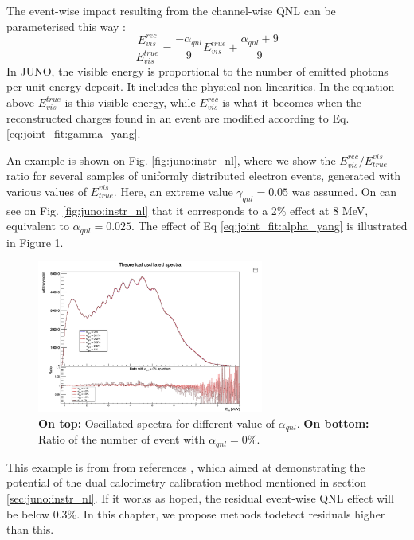\documentclass[../main.tex]{subfiles}
\begin{document}
The event-wise impact resulting from the channel-wise QNL can be parameterised this way :
\begin{equation}
  \label{eq:joint_fit:alpha_yang}
  \frac{E^{rec}_{vis}}{E^{true}_{vis}} = \frac{-\alpha_{qnl}}{9} E^{true}_{vis} + \frac{\alpha_{qnl} + 9}{9}
\end{equation}
In JUNO, the visible energy is proportional to the number of emitted photons per unit energy deposit. It includes the physical non linearities.
In the equation above $E_{vis}^{true}$ is this visible energy, while $E_{vis}^{rec}$ is what it becomes when the reconstructed charges found in an event are modified according to Eq. \ref{eq:joint_fit:gamma_yang}.

An example is shown on Fig. \ref{fig:juno:instr_nl}, where we show the $E^{rec}_{vis}/E_{true}^{vis}$ ratio for several samples of uniformly distributed electron events, generated with various values of $E_{true}^{vis}$.
Here, an extreme value $\gamma_{qnl}=0.05$ was assumed. On can see on Fig. \ref{fig:juno:instr_nl} that it corresponds to a 2\% effect at 8 MeV, equivalent to $\alpha_{qnl} = 0.025$. The effect of Eq \ref{eq:joint_fit:alpha_yang} is illustrated in Figure \ref{fig:joint_fit:spectrums_comp}.

\begin{figure}[ht]
  \centering
  \includegraphics[height=5cm]{images/joint_fit/spectrums.png}
  \caption{\textbf{On top:} Oscillated spectra for different value of $\alpha_{qnl}$. \textbf{On bottom:} Ratio of the number of event with $\alpha_{qnl} = 0\%$.}
  \label{fig:joint_fit:spectrums_comp}
\end{figure}

This example is from  from references \cite{han_dual_2021}, which aimed at demonstrating the potential of the dual calorimetry calibration method mentioned in section
\ref{sec:juno:instr_nl}. If it works as hoped, the residual event-wise QNL effect will be below 0.3\%. In this chapter, we propose methods todetect residuals higher than this.
\end{document}
